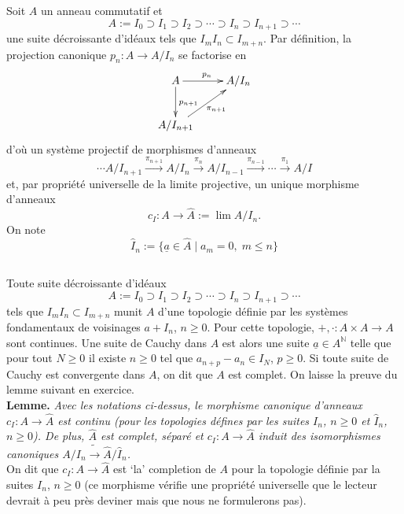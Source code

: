 \documentclass[a4paper, oneside, 12pt]{book}
\theoremstyle{definition} %
\newcommand{\N}{\mathbb{N}}
\begin{document}
 \section{}Soit $A$ un anneau commutatif et  $$A:=I_0\supset  I_1\supset I_2\supset \cdots \supset I_n\supset I_{n+1}\supset \cdots$$
une suite décroissante d'idéaux  tels que $I_m I_n\subset I_{m+n}$. 
Par définition, la projection canonique $p_n:A\rightarrow A/I_n$ se factorise en 
$$\xymatrix{A\ar[r]^{p_n}\ar[d]^{p_{n+1}}&A/I_n\\
A/I_{n+1}\ar[ur]_{\pi_{n+1}}&}$$
d'où un système projectif de morphismes d'anneaux 
$$\cdots  A/I_{n+1}\stackrel{\pi_{n+1}}{\rightarrow} A/I_n\stackrel{\pi_{n }}{\rightarrow}A/I_{n-1}\stackrel{\pi_{n-1}}{\rightarrow}\cdots \stackrel{\pi_1}{\rightarrow}A/I$$
et, par propriété universelle de la limite projective, un unique morphisme d'anneaux $$c_I:A\rightarrow \widehat{A}:=\lim A/I_n.$$
 On note $$\widehat{I}_n:=\lbrace \underline{a}\in \widehat{A}\; |\; a_m=0,\; m\leq n\rbrace $$
 \subsection{}Toute suite décroissante d'idéaux 
  $$A:=I_0\supset  I_1\supset I_2\supset \cdots \supset I_n\supset I_{n+1}\supset \cdots$$
  tels que $I_m I_n\subset I_{m+n}$
 munit $A$ d'une   topologie définie par les systèmes fondamentaux de voisinages $a+I_n$, $n\geq 0$. Pour cette topologie, $+,\cdot: A\times A\rightarrow A$ sont continues. Une suite de Cauchy dans $A$ est alors une suite $\underline{a}\in A^\N$ telle que pour tout $N\geq 0$ il  existe $n\geq 0$ tel que $a_{n+p}-a_n\in I_N$, $p\geq 0$. Si toute suite de Cauchy est convergente dans $A$, on dit que $A$ est complet. On laisse la preuve du lemme suivant en exercice.\\
 
 
 \textbf{Lemme.} \textit{Avec les notations ci-dessus,  le morphisme canonique d'anneaux $c_I:A\rightarrow \widehat{A}$ est continu (pour les topologies défines par les suites $I_n$, $n\geq 0$ et $\widehat{I}_n$, $n\geq 0$). De plus, $\widehat{A}$ est complet, séparé et $c_I:A\rightarrow \widehat{A}$ induit des isomorphismes canoniques $A/I_n\tilde{\rightarrow} \widehat{A}/\widehat{I}_n$.}\\
 
    On dit que   $c_I:A\rightarrow \widehat{A}$ est `la' completion de $A$ pour la topologie définie par la suites  $I_n$, $n\geq 0$ (ce morphisme vérifie une propriété universelle que le lecteur devrait à peu près deviner mais que nous ne formulerons pas).\\
\end{document}
